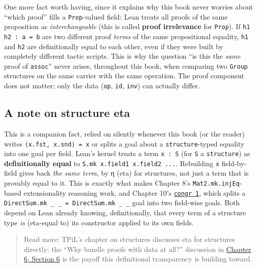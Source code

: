 One more fact worth having, since it explains why this book never worries about ``which proof'' fills a \texttt{Prop}-valued field: Lean treats all proofs of the same proposition as \emph{interchangeable} (this is called \textbf{proof irrelevance} for \texttt{Prop}). If \texttt{h1 h2 : a = b} are two different proof \emph{terms} of the same propositional equality, \texttt{h1} and \texttt{h2} are definitionally equal to each other, even if they were built by completely different tactic scripts. This is why the question ``is this the \emph{same} proof of \texttt{assoc}'' never arises, throughout this book, when comparing two \texttt{Group} structures on the same carrier with the same operation. The proof component does not matter; only the data (\texttt{op}, \texttt{id}, \texttt{inv}) can actually differ.

\subsection{A note on structure eta}\label{sec:05-rigor-check:04-defeq-vs-propeq:6}

This is a companion fact, relied on silently whenever this book (or the reader) writes \texttt{⟨x.fst, x.snd⟩ = x} or splits a goal about a \texttt{structure}-typed equality into one goal per field. Lean's kernel treats a term \texttt{x : S} (for \texttt{S} a \texttt{structure}) as \textbf{definitionally equal} to \texttt{S.mk x.field1 x.field2 ...}. Rebuilding \texttt{x} field-by-field gives back \emph{the same term}, by η (eta) for structures, not just a term that is provably equal to it. This is exactly what makes Chapter 8's \texttt{Mat2.mk.injEq}-based extensionality reasoning work, and Chapter 10's \href{https://lean-lang.org/doc/reference/latest/Tactic-Proofs/Tactic-Reference/}{\texttt{congr 1}}, which splits a \texttt{DirectSum.mk \_\allowbreak{} \_\allowbreak{} = DirectSum.mk \_\allowbreak{} \_\allowbreak{}} goal into two field-wise goals. Both depend on Lean already knowing, definitionally, that every term of a structure type \emph{is} (eta-equal to) its constructor applied to its own fields.

\begin{quote}
Read more: TPiL's chapter on structures discusses eta for structures directly; the ``Why bundle proofs with data at all?'' discussion in \hyperref[sec:06-groups:06-why-bundle:1]{Chapter 6, Section 6} is the payoff this definitional transparency is building toward.
\end{quote}

